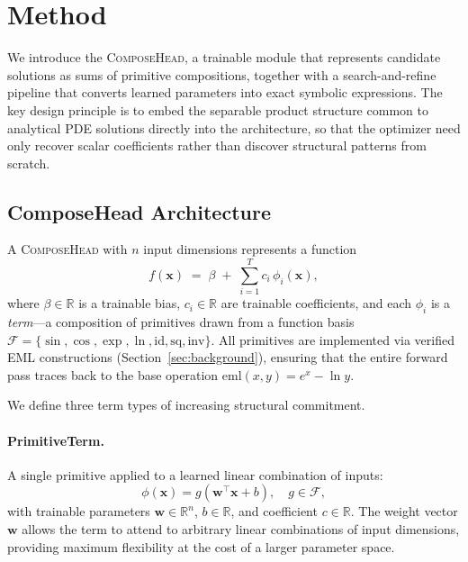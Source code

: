 \section{Method}
\label{sec:method}

We introduce the \textsc{ComposeHead}, a trainable module that represents candidate
solutions as sums of primitive compositions, together with a search-and-refine
pipeline that converts learned parameters into exact symbolic expressions.
The key design principle is to embed the separable product structure common to
analytical PDE solutions directly into the architecture, so that the optimizer
need only recover scalar coefficients rather than discover structural patterns
from scratch.

\subsection{ComposeHead Architecture}
\label{sec:composehead}

A \textsc{ComposeHead} with $n$ input dimensions represents a function
\begin{equation}
\label{eq:composehead}
    f(\mathbf{x}) \;=\; \beta \;+\; \sum_{i=1}^{T} c_i \, \phi_i(\mathbf{x}),
\end{equation}
where $\beta \in \mathbb{R}$ is a trainable bias, $c_i \in \mathbb{R}$ are trainable
coefficients, and each $\phi_i$ is a \emph{term}---a composition of primitives drawn
from a function basis
$\mathcal{F} = \{\sin, \cos, \exp, \ln, \mathrm{id}, \mathrm{sq}, \mathrm{inv}\}$.
All primitives are implemented via verified EML constructions (Section~\ref{sec:background}),
ensuring that the entire forward pass traces back to the base operation
$\mathrm{eml}(x, y) = e^x - \ln y$.

We define three term types of increasing structural commitment.

\paragraph{PrimitiveTerm.}
A single primitive applied to a learned linear combination of inputs:
\begin{equation}
\label{eq:primitiveterm}
    \phi(\mathbf{x}) = g\!\left(\mathbf{w}^\top \mathbf{x} + b\right),
    \quad g \in \mathcal{F},
\end{equation}
with trainable parameters $\mathbf{w} \in \mathbb{R}^n$, $b \in \mathbb{R}$, and
coefficient $c \in \mathbb{R}$.  The weight vector $\mathbf{w}$ allows the term to
attend to arbitrary linear combinations of input dimensions, providing maximum
flexibility at the cost of a larger parameter space.

